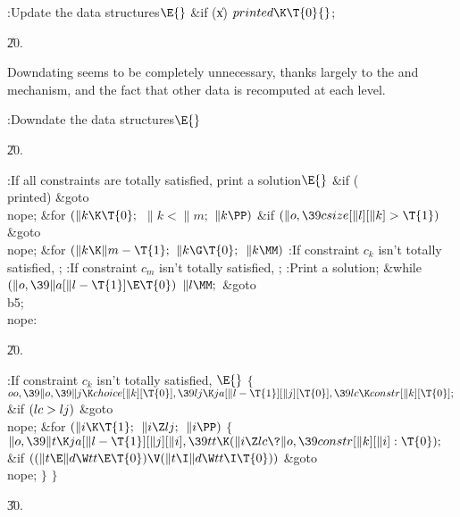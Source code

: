 \Y\B\4:Update the data structures\X${}\E{}$\6
\&{if} (\|x)\1\5
${}\\{printed}\K\T{0}{}$;\2\par
\U20.\fi

Downdating seems to be completely unnecessary, thanks largely to
the  and  mechanism, and the fact that other data
is recomputed at each level.

\Y\B\4:Downdate the data structures\X${}\E{}$\par
\U20.\fi

\B{}:If all constraints are totally satisfied, print a solution\X${}%
\E{}$\6
\&{if} (\\{printed})\1\5
\&{goto} \\{nope};\2\6
\&{for} ${}(\|k\K\T{0};{}$ ${}\|k<\|m;{}$ ${}\|k\PP){}$\1\6
\&{if} ${}(\|o,\39\\{csize}[\|l][\|k]>\T{1}){}$\1\5
\&{goto} \\{nope};\2\2\6
\&{for} ${}(\|k\K\|m-\T{1};{}$ ${}\|k\G\T{0};{}$ ${}\|k\MM){}$\1\5
:If constraint $c_k$ isn't totally satisfied, \X;\2\6
:If constraint $c_m$ isn't totally satisfied, \X;\6
:Print a solution\X;\6
\&{while} ${}(\|o,\39\|a[\|l-\T{1}]\E\T{0}){}$\1\5
${}\|l\MM;{}$\2\6
\&{goto} \\{b5}; \\{nope}:\par
\U20.\fi

\B{}:If constraint $c_k$ isn't totally satisfied, \X${}\E{}$\6
${}\{{}$\1\6
${}\\{oo},\39\|o,\39\|j\K\\{choice}[\|k][\T{0}],\39\\{lj}\K\\{ja}[\|l-\T{1}][%
\|j][\T{0}],\39\\{lc}\K\\{constr}[\|k][\T{0}];{}$\6
\&{if} ${}(\\{lc}>\\{lj}){}$\1\5
\&{goto} \\{nope};\2\6
\&{for} ${}(\|i\K\T{1};{}$ ${}\|i\Z\\{lj};{}$ ${}\|i\PP){}$\5
${}\{{}$\1\6
${}\|o,\39\|t\K\\{ja}[\|l-\T{1}][\|j][\|i],\39\\{tt}\K(\|i\Z\\{lc}\?\|o,\39%
\\{constr}[\|k][\|i]:\T{0});{}$\6
\&{if} ${}((\|t\E\|d\W\\{tt}\E\T{0})\V(\|t\I\|d\W\\{tt}\I\T{0})){}$\1\5
\&{goto} \\{nope};\2\6
\4${}\}{}$\2\6
\4${}\}{}$\2\par
\U30.\fi

